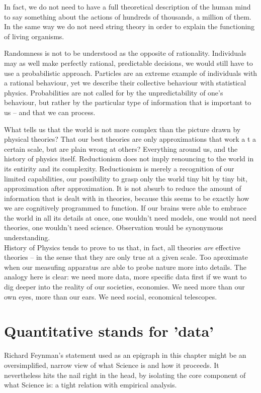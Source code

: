 In fact, we do not need to have a full theoretical description of the human mind
to say something about the actions of hundreds of thousands, a million of them.
In the same way we do not need string theory in order to explain the
functioning of living organisms.

Randomness is not to be understood as the opposite of rationality. Individuals
may as well make perfectly rational, predictable decisions, we would still have
to use a probabilistic approach. Particles are an extreme example of individuals
with a rational behaviour, yet we describe their collective behaviour with
statistical physics. Probabilities are not called for by the unpredictability of
one's behaviour, but rather by the particular type of information that is
important to us -- and that we can process.

What tells us that the world is not more complex than the picture drawn by
physical theories? That our best theories are only approximations that work a t
a certain scale, but are plain wrong at others? Everything around us, and the
history of physics itself. Reductionism does not imply renouncing to the world
in its entirity and its complexity. Reductionism is merely a recognition of our
limited capabilities, our possibility to grasp only the world tiny bit by tiny
bit, approximation after approximation. It is not absurb to reduce the amount of
information that is dealt with in theories, because this seems to be exactly how
we are cognitively programmed to function. If our brains were able to embrace
the world in all its details at once, one wouldn't need models, one would not
need theories, one wouldn't need science. Observation would be synonymous 
understanding.\\
History of Physics tends to prove to us that, in fact, all theories \emph{are}
effective theories -- in the sense that they are only true at a given scale. Too
aproximate when our measufing apparatus are able to probe nature more into
details. The analogy here is clear: we need more data, more specific data first
if we want to dig deeper into the reality of our societies, economies. We need
more than our own eyes, more than our ears. We need social, economical
telescopes.

\section{Quantitative stands for 'data'}
\label{sec:quantitative_stands_for_data_}

Richard Feynman's statement used as an epigraph in this chapter might be an
oversimplified, narrow view of what Science is and how it proceeds. It
nevertheless hits the nail right in the head, by isolating the core component of
what Science is: a tight relation with empirical analysis.

